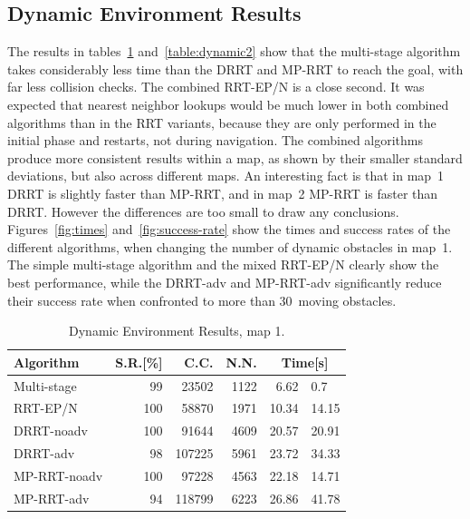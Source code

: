 \subsection{Dynamic Environment Results}
The results in tables~\ref{table:dynamic1} and~\ref{table:dynamic2} show that
the multi-stage algorithm takes considerably less time than the DRRT 
and MP-RRT to reach
the goal, with far less collision checks. The combined RRT-EP/N is a close
second. It was expected that nearest neighbor
lookups would be much lower in both combined algorithms than in the RRT variants,
because they are only performed in the initial phase and restarts, 
not during navigation.
The combined algorithms produce more consistent results
within a map,
as shown by their smaller standard deviations, but also across different
maps. An interesting fact is that in map~1 DRRT is slightly faster than MP-RRT, and
in map~2 MP-RRT is faster than DRRT. However the differences are too small to
draw any conclusions.
Figures~\ref{fig:times} and~\ref{fig:success-rate} show the times and
success rates of the different algorithms, when changing the number of dynamic
obstacles in map~1. The simple multi-stage algorithm and the mixed RRT-EP/N
clearly show the best performance, while the DRRT-adv and MP-RRT-adv
significantly reduce their success rate when confronted to more than 30~moving
obstacles. 



\begin{table}[h!]
\caption{Dynamic Environment Results, map 1.}
\label{table:dynamic1}
\centering
\begin{tabular}{|l||r|r|r|r@{$\ \pm\ $}l|}
\hline
\textbf{Algorithm} & \textbf{S.R.[\%]} & \textbf{C.C.} & \textbf{N.N.} &
\multicolumn{2}{c|}{\textbf{Time[s]}}\\
\hline
Multi-stage & 99 & 23502 & 1122 & 6.62 & 0.7\\
\hline
RRT-EP/N & 100 & 58870 & 1971 & 10.34 & 14.15 \\
\hline
DRRT-noadv & 100 & 91644 & 4609 & 20.57 & 20.91\\
\hline
DRRT-adv & 98 & 107225 & 5961 & 23.72 & 34.33\\
\hline
MP-RRT-noadv & 100 & 97228 & 4563 & 22.18 & 14.71\\
\hline
MP-RRT-adv & 94 & 118799 & 6223 & 26.86 & 41.78\\
\hline
\end{tabular}
\end{table}

